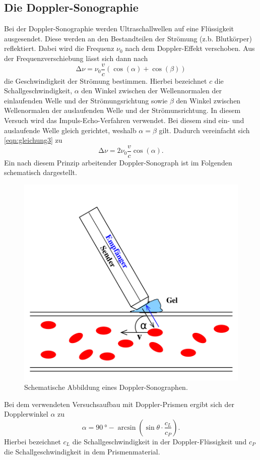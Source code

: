 \subsection{Die Doppler-Sonographie}
Bei der Doppler-Sonographie werden Ultraschallwellen auf eine Flüssigkeit
ausgesendet. Diese werden an den Bestandteilen der Strömung (z.b. Blutkörper)
reflektiert. Dabei wird die Frequenz $\nu_0$ nach dem Doppler-Effekt verschoben.
Aus der Frequenzverschiebung lässt sich dann nach
\begin{equation}
\increment \nu = \nu_0 \frac{v}{c}(\cos(\alpha) + \cos(\beta))
\label{eqn:gleichung3}
\end{equation}
die Geschwindigkeit der Strömung bestimmen.
Hierbei bezeichnet $c$ die Schallgeschwindigkeit, $\alpha$ den Winkel zwischen der
Wellennormalen der einlaufenden Welle und der Strömungsrichtung sowie $\beta$ den
Winkel zwischen Wellenormalen der auslaufenden Welle und der Strömunsrichtung.
In diesem Versuch wird das Impuls-Echo-Verfahren verwendet. Bei diesem sind ein-
und auslaufende Welle gleich gerichtet, weshalb $\alpha = \beta$ gilt. Dadurch
vereinfacht sich \eqref{eqn:gleichung3} zu
\begin{equation*}
\increment \nu = 2 \nu_0 \frac{v}{c} \cos(\alpha).
\end{equation*}
Ein nach diesem Prinzip arbeitender Doppler-Sonograph ist im Folgenden schematisch
dargestellt.
\begin{figure}[H]
  \centering
  \includegraphics[scale=0.5]{content/dopplersonograph.png}
  \caption{Schematische Abbildung eines Doppler-Sonographen. \cite{sample}}
  \label{fig:dopplersonographtheorie}
\end{figure}
\noindent
Bei dem verwendeten Versuchsaufbau mit Doppler-Prismen ergibt sich der Dopplerwinkel $\alpha$
zu
\begin{equation}
  \alpha = \SI{90}{\degree} - \arcsin( \sin{\theta} \cdot \frac{c_L}{c_P}).
  \label{eqn:gleichung5theorie}
\end{equation}
Hierbei bezeichnet $c_L$ die Schallgeschwindigkeit in der Doppler-Flüssigkeit
und $c_P$ die Schallgeschwindigkeit in dem Prismenmaterial.


